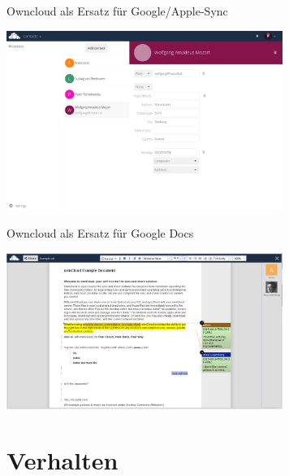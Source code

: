 \documentclass[12pt, xcolor={svgnames,table}]{beamer}
\begin{document}
\begin{frame}{Owncloud als Ersatz für Google/Apple-Sync}
  \begin{center}
    \includegraphics[width=9cm]{img/owncloud-contacts.png}
  \end{center}
\end{frame}

\begin{frame}{Owncloud als Ersatz für Google Docs}
  \begin{center}
    \includegraphics[width=9cm]{img/owncloud-documents.png}
  \end{center}
\end{frame}

\section{Verhalten}
\subsection{}
\end{document}
